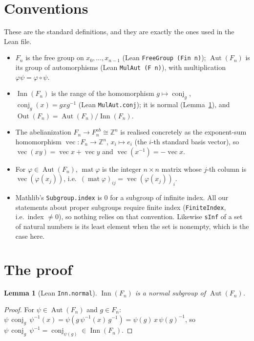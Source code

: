 \documentclass[11pt]{article}
\newtheorem{lemma}[theorem]{Lemma}
\theoremstyle{definition}
\theoremstyle{remark}
\renewcommand{\_}{\oldus\allowbreak}
\newcommand{\Z}{\mathbb{Z}}
\newcommand{\Aut}{\operatorname{Aut}}
\newcommand{\Out}{\operatorname{Out}}
\newcommand{\Inn}{\operatorname{Inn}}
\newcommand{\vect}{\operatorname{vec}}
\newcommand{\mat}{\operatorname{mat}}
\newcommand{\conj}{\operatorname{conj}}
\begin{document}
\section{Conventions}

These are the standard definitions, and they are exactly the ones used in the Lean file.
\begin{itemize}
  \item $F_n$ is the free group on $x_0,\dots,x_{n-1}$ (Lean \texttt{FreeGroup (Fin n)}); $\Aut(F_n)$ is its
        group of automorphisms (Lean \texttt{MulAut (F n)}), with multiplication $\varphi\psi=\varphi\circ\psi$.
  \item $\Inn(F_n)$ is the range of the homomorphism $g\mapsto\conj_g$, $\conj_g(x)=gxg^{-1}$
        (Lean \texttt{MulAut.conj}); it is normal (Lemma~\ref{lem:inn}), and
        $\Out(F_n)=\Aut(F_n)/\Inn(F_n)$.
  \item The abelianization $F_n\to F_n^{ab}\cong\Z^n$ is realised concretely as the exponent-sum
        homomorphism $\vect:F_n\to\Z^n$, $x_i\mapsto e_i$ (the $i$-th standard basis vector), so
        $\vect(xy)=\vect x+\vect y$ and $\vect(x^{-1})=-\vect x$.
  \item For $\varphi\in\Aut(F_n)$, $\mat\varphi$ is the integer $n\times n$ matrix whose $j$-th column is
        $\vect(\varphi(x_j))$, i.e.\ $(\mat\varphi)_{ij}=\vect(\varphi(x_j))_i$.
  \item Mathlib's \texttt{Subgroup.index} is $0$ for a subgroup of infinite index. All our statements about
        proper subgroups require finite index (\texttt{FiniteIndex}, i.e.\ index $\ne 0$), so nothing relies
        on that convention. Likewise \texttt{sInf} of a set of natural numbers is its least element when the
        set is nonempty, which is the case here.
\end{itemize}

\section{The proof}

\begin{lemma}[Lean \texttt{Inn.normal}]\label{lem:inn}
$\Inn(F_n)$ is a normal subgroup of $\Aut(F_n)$.
\end{lemma}
\begin{proof}
For $\psi\in\Aut(F_n)$ and $g\in F_n$: $\psi\,\conj_g\,\psi^{-1}(x)=\psi(g\,\psi^{-1}(x)\,g^{-1})
=\psi(g)\,x\,\psi(g)^{-1}$, so $\psi\,\conj_g\,\psi^{-1}=\conj_{\psi(g)}\in\Inn(F_n)$.
\end{proof}
\end{document}
